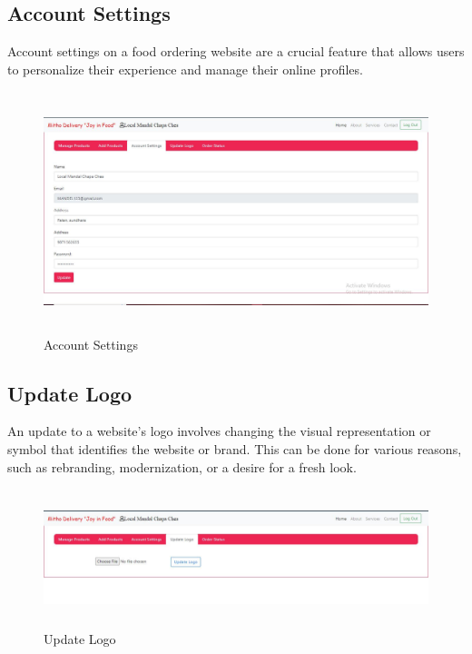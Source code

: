 \subsection{Account Settings}
Account settings on a food ordering website are a crucial feature that allows users to personalize their experience and manage their online profiles.  
\begin{figure}[h]
    \centering
    \includegraphics[height=7cm]{img/Graphics/hotel manage account.JPG}
    \caption{Account Settings}
\end{figure}

\subsection{Update Logo}
An update to a website's logo involves changing the visual representation or symbol that identifies the website or brand. This can be done for various reasons, such as rebranding, modernization, or a desire for a fresh look.
\begin{figure}[h]
    \centering
    \includegraphics[height=4cm]{img/Graphics/hotel manage logo.JPG}
    \caption{Update Logo}
\end{figure}

\newpage

